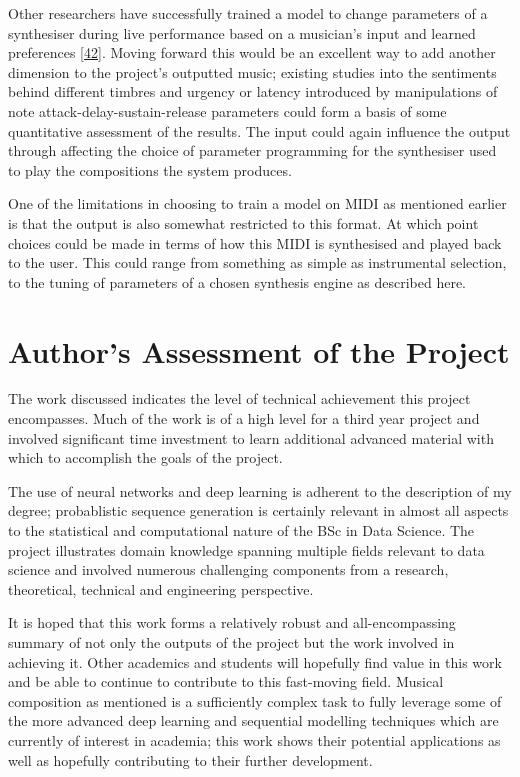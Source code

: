 \documentclass[12pt,]{article}
\begin{document}
Other researchers have successfully trained a model to change parameters
of a synthesiser during live performance based on a musician's input and
learned preferences {[}\protect\hyperlink{ref-sommer2014towards}{42}{]}.
Moving forward this would be an excellent way to add another dimension
to the project's outputted music; existing studies into the sentiments
behind different timbres and urgency or latency introduced by
manipulations of note attack-delay-sustain-release parameters could form
a basis of some quantitative assessment of the results. The input could
again influence the output through affecting the choice of parameter
programming for the synthesiser used to play the compositions the system
produces.

One of the limitations in choosing to train a model on MIDI as mentioned
earlier is that the output is also somewhat restricted to this format.
At which point choices could be made in terms of how this MIDI is
synthesised and played back to the user. This could range from something
as simple as instrumental selection, to the tuning of parameters of a
chosen synthesis engine as described here.

\hypertarget{authors-assessment-of-the-project}{%
\section{Author's Assessment of the
Project}\label{authors-assessment-of-the-project}}

The work discussed indicates the level of technical achievement this
project encompasses. Much of the work is of a high level for a third
year project and involved significant time investment to learn
additional advanced material with which to accomplish the goals of the
project.

The use of neural networks and deep learning is adherent to the
description of my degree; probablistic sequence generation is certainly
relevant in almost all aspects to the statistical and computational
nature of the BSc in Data Science. The project illustrates domain
knowledge spanning multiple fields relevant to data science and involved
numerous challenging components from a research, theoretical, technical
and engineering perspective.

It is hoped that this work forms a relatively robust and
all-encompassing summary of not only the outputs of the project but the
work involved in achieving it. Other academics and students will
hopefully find value in this work and be able to continue to contribute
to this fast-moving field. Musical composition as mentioned is a
sufficiently complex task to fully leverage some of the more advanced
deep learning and sequential modelling techniques which are currently of
interest in academia; this work shows their potential applications as
well as hopefully contributing to their further development.
\end{document}
